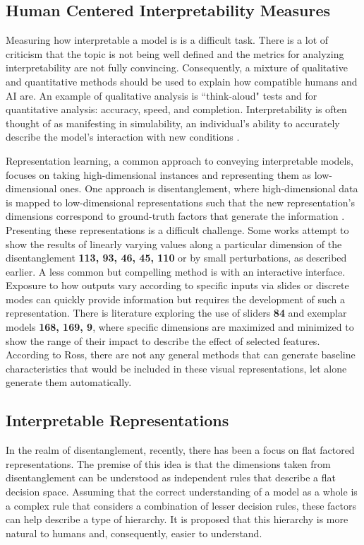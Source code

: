 \documentclass[twoside,11pt]{article}
\begin{document}
\subsection{Human Centered Interpretability Measures}
Measuring how interpretable a model is is a difficult task. There is a lot of criticism that the topic is not being well defined \citep{lipton2018mythos} and the metrics for analyzing interpretability are not fully convincing. Consequently, a mixture of qualitative and quantitative methods should be used to explain how compatible humans and AI are. An example of qualitative analysis is ``think-aloud" tests \citep{lewis1982using} and for quantitative analysis: accuracy, speed, and completion. Interpretability is often thought of as manifesting in simulability, an individual's ability to accurately describe the model's interaction with new conditions \citep{miller2019explanation}. 

Representation learning, a common approach to conveying interpretable models, focuses on taking high-dimensional instances and representing them as low-dimensional ones. One approach is disentanglement, where high-dimensional data is mapped to low-dimensional representations such that the new representation's dimensions correspond to ground-truth factors that generate the information \citep{bengio2013representation}. Presenting these representations is a difficult challenge. Some works attempt to show the results of linearly varying values along a particular dimension of the disentanglement \textbf{113, 93, 46, 45, 110} or by small perturbations, as described earlier. A less common but compelling method is with an interactive interface. Exposure to how outputs vary according to specific inputs via slides or discrete modes can quickly provide information but requires the development of such a representation. There is literature exploring the use of sliders \textbf{84} and exemplar models \textbf{168, 169, 9}, where specific dimensions are maximized and minimized to show the range of their impact to describe the effect of selected features. According to Ross, there are not any general methods that can generate baseline characteristics that would be included in these visual representations, let alone generate them automatically.

\subsection{Interpretable Representations}
In the realm of disentanglement, recently, there has been a focus on flat factored representations. The premise of this idea is that the dimensions taken from disentanglement can be understood as independent rules that describe a flat decision space. Assuming that the correct understanding of a model as a whole is a complex rule that considers a combination of lesser decision rules, these factors can help describe a type of hierarchy. It is proposed that this hierarchy is more natural to humans and, consequently, easier to understand.
\end{document}
